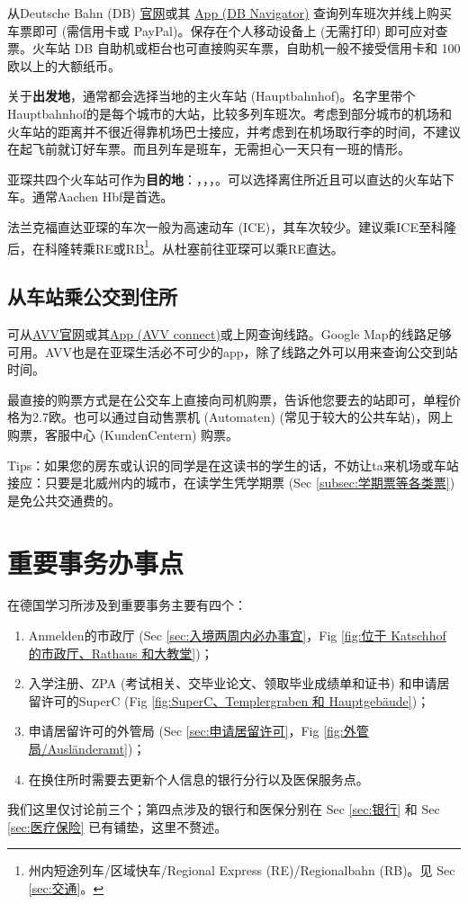     从Deutsche Bahn (DB) \href{https://www.bahn.de/}{官网}或其 \href{https://www.bahn.de/p/view/service/mobile/db-navigator.shtml}{App (DB Navigator)} 查询列车班次并线上购买车票即可 (需信用卡或 PayPal)。保存在个人移动设备上 (无需打印) 即可应对查票。火车站 DB 自助机或柜台也可直接购买车票，自助机一般不接受信用卡和 100欧以上的大额纸币。

    关于\textbf{出发地}，通常都会选择当地的主火车站 (Hauptbahnhof)。名字里带个Hauptbahnhof的是每个城市的大站，比较多列车班次。考虑到部分城市的机场和火车站的距离并不很近得靠机场巴士接应，并考虑到在机场取行李的时间，不建议在起飞前就订好车票。而且列车是班车，无需担心一天只有一班的情形。

    亚琛共四个火车站可作为\textbf{目的地}：，，，。可以选择离住所近且可以直达的火车站下车。通常Aachen Hbf是首选。

    法兰克福直达亚琛的车次一般为高速动车 (ICE)，其车次较少。建议乘ICE至科隆后，在科隆转乘RE或RB\footnote{州内短途列车/区域快车/Regional Express (RE)/Regionalbahn (RB)。见 Sec \ref{sec:交通}。}。从杜塞前往亚琛可以乘RE直达。

  \subsection{从车站乘公交到住所}\label{subsec:从车站乘公交到住所}

    可从\href{http://www.avv.de/}{AVV官网}或其\href{http://www.avv.de/}{App (AVV connect)}或上网查询线路。Google Map的线路足够可用。AVV也是在亚琛生活必不可少的app，除了线路之外可以用来查询公交到站时间。

    最直接的购票方式是在公交车上直接向司机购票，告诉他您要去的站即可，单程价格为2.7欧。也可以通过自动售票机 (Automaten) (常见于较大的公共车站)，网上购票，客服中心 (KundenCentern) 购票。

    Tips：如果您的房东或认识的同学是在这读书的学生的话，不妨让ta来机场或车站接应：只要是北威州内的城市，在读学生凭学期票 (Sec \ref{subsec:学期票等各类票}) 是免公共交通费的。

\section{重要事务办事点}\label{sec:重要事务办事点}

  在德国学习所涉及到重要事务主要有四个：
  \begin{enumerate}
    \item Anmelden的市政厅 (Sec \ref{sec:入境两周内必办事宜}，Fig \ref{fig:位于 Katschhof 的市政厅、Rathaus 和大教堂})；
    \item 入学注册、ZPA (考试相关、交毕业论文、领取毕业成绩单和证书) 和申请居留许可的SuperC (Fig \ref{fig:SuperC、Templergraben 和 Hauptgebäude})；
    \item 申请居留许可的外管局 (Sec \ref{sec:申请居留许可}，Fig \ref{fig:外管局/Ausländeramt})；
    \item 在换住所时需要去更新个人信息的银行分行以及医保服务点。
  \end{enumerate}
  我们这里仅讨论前三个；第四点涉及的银行和医保分别在 Sec \ref{sec:银行} 和 Sec \ref{sec:医疗保险} 已有铺垫，这里不赘述。

